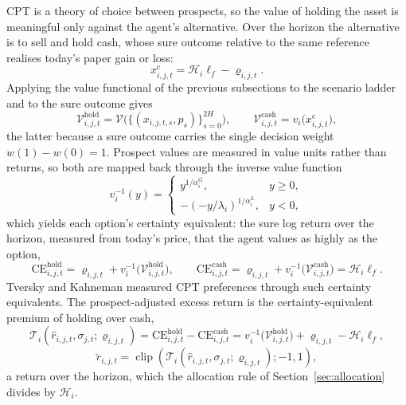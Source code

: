 \documentclass[12pt, a4paper]{article}
\DeclareMathOperator{\clip}{clip}
\begin{document}
    CPT is a theory of choice between prospects, so the value of holding the asset
    is meaningful only against the agent's alternative. Over the horizon the
    alternative is to sell and hold cash, whose sure outcome relative to the same
    reference realises today's paper gain or loss:
    \[
        x_{i,j,t}^{\mathrm{c}}=\mathcal H_i\ell_f-\varrho_{i,j,t}.
    \]
    Applying the value functional of the previous subsections to the scenario
    ladder and to the sure outcome gives
    \[
        \mathcal{V}_{i,j,t}^{\mathrm{hold}}
        =
        \mathcal{V}\bigl(\{(x_{i,j,t,s},p_s)\}_{s=0}^{2H}\bigr),
        \qquad
        \mathcal{V}_{i,j,t}^{\mathrm{cash}}=v_i\bigl(x_{i,j,t}^{\mathrm{c}}\bigr),
    \]
    the latter because a sure outcome carries the single decision weight
    \(w(1)-w(0)=1\). Prospect values are measured in value units rather than
    returns, so both are mapped back through the inverse value function
    \[
        v_i^{-1}(y)=
        \begin{cases}
            y^{1/\alpha_i^G}, & y\ge 0,\\[0.8ex]
            -\left(-y/\lambda_i\right)^{1/\alpha_i^L}, & y<0,
        \end{cases}
    \]
    which yields each option's certainty equivalent: the sure log return over the
    horizon, measured from today's price, that the agent values as highly as the
    option,
    \[
        \mathrm{CE}_{i,j,t}^{\mathrm{hold}}
        =\varrho_{i,j,t}+v_i^{-1}\bigl(\mathcal{V}_{i,j,t}^{\mathrm{hold}}\bigr),
        \qquad
        \mathrm{CE}_{i,j,t}^{\mathrm{cash}}
        =\varrho_{i,j,t}+v_i^{-1}\bigl(\mathcal{V}_{i,j,t}^{\mathrm{cash}}\bigr)=\mathcal H_i\ell_f.
    \]
    Tversky and Kahneman measured CPT preferences through such certainty
    equivalents. The prospect-adjusted excess return is the certainty-equivalent
    premium of holding over cash,
    \[
        \mathcal{T}_i(\hat r_{i,j,t},\sigma_{j,t};\varrho_{i,j,t})
        =
        \mathrm{CE}_{i,j,t}^{\mathrm{hold}}-\mathrm{CE}_{i,j,t}^{\mathrm{cash}}
        =
        v_i^{-1}\bigl(\mathcal{V}_{i,j,t}^{\mathrm{hold}}\bigr)+\varrho_{i,j,t}-\mathcal H_i\ell_f,
    \]
    \[
        \breve r_{i,j,t}
        =
        \clip\!\left(
                   \mathcal{T}_i(\hat r_{i,j,t},\sigma_{j,t};\varrho_{i,j,t});
            -1,1
        \right),
    \]
    a return over the horizon, which the allocation rule of
    Section~\ref{sec:allocation} divides by \(\mathcal H_i\).
\end{document}
